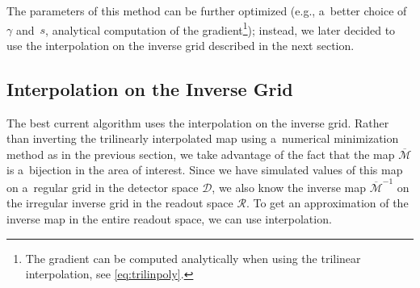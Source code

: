 			The parameters of this method can be further optimized (e.g., a~better choice of $\gamma$ and~$s$, analytical computation of the gradient\footnote{The gradient can be computed analytically when using the trilinear interpolation, see \cref{eq:trilinpoly}.}); instead, we later decided to use the interpolation on the inverse grid described in the next section.
			
		
		\subsection{Interpolation on the Inverse Grid}
		\label{sec:interpol}			
			The best current algorithm uses the interpolation on the inverse grid. Rather than inverting the trilinearly interpolated map using a~numerical minimization method as in the previous section, we take advantage of the fact that the map $\overline{\mathcal{M}}$ is a~bijection in the area of interest. Since we have simulated values of this map on a~regular grid in the detector space $\mathcal{D}$, we also know the inverse map $\overline{\mathcal{M}}^{-1}$ on the irregular inverse grid in the readout space $\mathcal{R}$. To get an approximation of the inverse map in the entire readout space, we can use interpolation.
			
